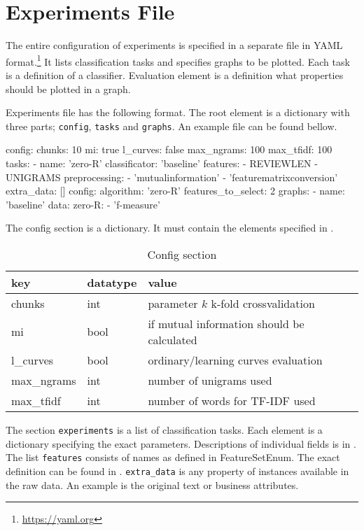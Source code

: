 \section{Experiments File}

The entire configuration of experiments is specified in a separate file in YAML format.\footnote{\url{https://yaml.org}}
It lists classification tasks and specifies graphs to be plotted.
Each task is a definition of a classifier.
Evaluation element is a definition what properties should be plotted in a graph.

Experiments file has the following format.
The root element is a dictionary with three parts;
\texttt{config}, \texttt{tasks} and \texttt{graphs}.
An example file can be found bellow.

\begin{code}
config:
  chunks: 10
  mi: true
  l_curves: false
  max_ngrams: 100
  max_tfidf: 100
tasks:
  - name: 'zero-R'
    classificator: 'baseline'
    features:
      - REVIEWLEN
      - UNIGRAMS
    preprocessing:
      - 'mutualinformation'
      - 'featurematrixconversion'
    extra_data: []
    config:
      algorithm: 'zero-R'
      features_to_select: 2
graphs:
  - name: 'baseline'
    data:
      zero-R:
        - 'f-measure'
\end{code}

The config section is a dictionary.
It must contain the elements specified in .

\begin{table}[h]
\centering
\begin{tabular}{lll}
\toprule
\textbf{key} & \textbf{datatype} & \textbf{value} \\
\midrule

chunks & int & parameter $k$  k-fold crossvalidation\\
mi & bool & if mutual information should be calculated\\
l\_curves & bool & ordinary/learning curves evaluation\\
max\_ngrams & int & number of unigrams used \\
max\_tfidf & int & number of words for TF-IDF used\\

\bottomrule
\end{tabular}

\caption{Config section}\label{tab:config_yaml}
\end{table}


The section \texttt{experiments} is a list of classification tasks.
Each element is a dictionary specifying the exact parameters.
Descriptions of individual fields is in .
The list \texttt{features} consists of names as defined in FeatureSetEnum.
The exact definition can be found in .
\texttt{extra\_data} is any property of instances available in the raw data.
An example is the original text or business attributes.

